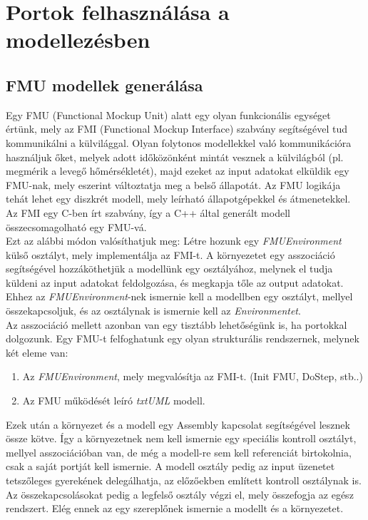 \documentclass[a4paper,12pt]{report}
\begin{document}
\chapter{Portok felhasználása a modellezésben}

\section{FMU modellek generálása}
Egy FMU (Functional Mockup Unit) alatt egy olyan funkcionális egységet értünk, mely az FMI (Functional Mockup Interface) \cite{fmi_standard} szabvány segítségével tud kommunikálni a külvilággal. Olyan folytonos modellekkel való kommunikációra használjuk őket, melyek adott időközönként mintát vesznek a külvilágból (pl. megmérik a levegő hőmérsékletét), majd ezeket az input adatokat elküldik egy FMU-nak, mely eszerint változtatja meg a belső állapotát. Az FMU logikája tehát lehet egy diszkrét modell, mely leírható állapotgépekkel és átmenetekkel. Az FMI egy C-ben írt szabvány, így a C++ által generált modell összecsomagolható egy FMU-vá. \cite{fmu_export} \\
Ezt az alábbi módon valósíthatjuk meg: Létre hozunk egy \textit{FMUEnvironment} külső osztályt, mely implementálja az FMI-t. A környezetet egy asszociáció segítségével hozzáköthetjük a modellünk egy osztályához,  melynek el tudja küldeni az input adatokat feldolgozása, és megkapja tőle az output adatokat. Ehhez az \textit{FMUEnvironment}-nek ismernie kell a modellben egy osztályt, mellyel összekapcsoljuk, és az osztálynak is ismernie kell az \textit{Environmentet}.   \\
Az asszociáció mellett azonban van egy tisztább lehetőségünk is, ha portokkal dolgozunk. Egy FMU-t felfoghatunk egy olyan strukturális rendszernek, melynek két eleme van:
\begin{enumerate}
\item Az \textit{FMUEnvironment}, mely megvalósítja az FMI-t. (Init FMU, DoStep, stb..)
\item Az FMU működését leíró \textit{txtUML} modell.
\end{enumerate}
Ezek után a környezet és a modell egy Assembly kapcsolat segítségével lesznek össze kötve. Így a környezetnek nem kell ismernie egy speciális kontroll osztályt, mellyel asszociációban van, de még a modell-re sem kell referenciát birtokolnia, csak a saját portját kell ismernie. A modell osztály pedig az input üzenetet tetszőleges gyerekének delegálhatja, az előzőekben említett kontroll osztálynak is. Az összekapcsolásokat pedig a legfelső osztály végzi el, mely összefogja az egész rendszert. Elég ennek az egy szereplőnek ismernie a modellt és a környezetet.  \\
\end{document}
